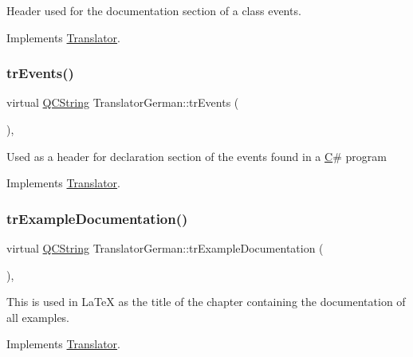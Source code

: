 Header used for the documentation section of a class\textquotesingle{} events. 

Implements \mbox{\hyperlink{class_translator}{Translator}}.

\mbox{\label{class_translator_german_a97f8b6f8a6d7a0444df882347533faae}} 
\subsubsection{\texorpdfstring{trEvents()}{trEvents()}}
{\footnotesize\ttfamily virtual \mbox{\hyperlink{class_q_c_string}{Q\+C\+String}} Translator\+German\+::tr\+Events (\begin{DoxyParamCaption}{ }\end{DoxyParamCaption})\hspace{0.3cm}{\ttfamily [inline]}, {\ttfamily [virtual]}}

Used as a header for declaration section of the events found in a \mbox{\hyperlink{class_c}{C}}\# program 

Implements \mbox{\hyperlink{class_translator}{Translator}}.

\mbox{\label{class_translator_german_adab916e93bf450286b489ee1b0b4bd41}} 
\subsubsection{\texorpdfstring{trExampleDocumentation()}{trExampleDocumentation()}}
{\footnotesize\ttfamily virtual \mbox{\hyperlink{class_q_c_string}{Q\+C\+String}} Translator\+German\+::tr\+Example\+Documentation (\begin{DoxyParamCaption}{ }\end{DoxyParamCaption})\hspace{0.3cm}{\ttfamily [inline]}, {\ttfamily [virtual]}}

This is used in La\+TeX as the title of the chapter containing the documentation of all examples. 

Implements \mbox{\hyperlink{class_translator}{Translator}}.

\mbox{\label{class_translator_german_a24ef90fbd80c5e1a3964afd7cbd9db8b}} 
